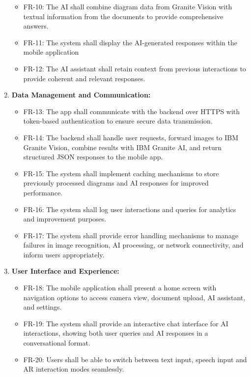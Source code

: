 \documentclass[10pt]{article}
\begin{document}
\begin{enumerate}
\begin{itemize}
                \item FR-10: The AI shall combine diagram data from Granite Vision with textual information from the documents to provide comprehensive answers.
                \item FR-11: The system shall display the AI-generated responses within the mobile application
                \item FR-12: The AI assistant shall retain context from previous interactions to provide coherent and relevant responses.
            \end{itemize}
        \item \textbf{Data Management and Communication:}
            \begin{itemize}
                \item FR-13: The app shall communicate with the backend over HTTPS with token-based authentication to ensure secure data transmission.
                \item FR-14: The backend shall handle user requests, forward images to IBM Granite Vision, combine results with IBM Granite AI, and return structured JSON responses to the mobile app.
                \item FR-15: The system shall implement caching mechanisms to store previously processed diagrams and AI responses for improved performance.
                \item FR-16: The system shall log user interactions and queries for analytics and improvement purposes.
                \item FR-17: The system shall provide error handling mechanisms to manage failures in image recognition, AI processing, or network connectivity, and inform users appropriately.
            \end{itemize}
        \item \textbf{User Interface and Experience:}
            \begin{itemize}
                \item FR-18: The mobile application shall present a home screen with navigation options to access camera view, document upload, AI assistant, and settings.
                \item FR-19: The system shall provide an interactive chat interface for AI interactions, showing both user queries and AI responses in a conversational format.
                \item FR-20: Users shall be able to switch between text input, speech input and AR interaction modes seamlessly.
            \end{itemize}
    \end{enumerate}
\end{document}
